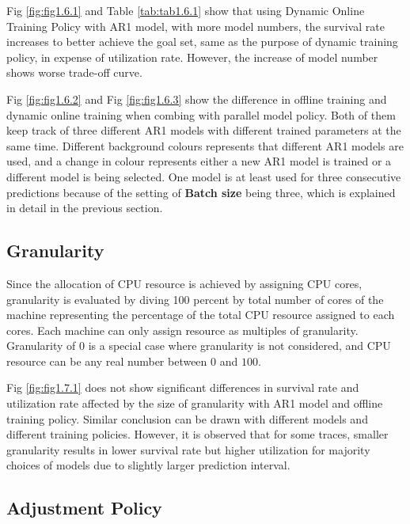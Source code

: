 \documentclass{article}
\begin{document}
\begin{flushleft}
Fig \ref{fig:fig1.6.1} and Table \ref{tab:tab1.6.1} show that using Dynamic Online Training Policy with AR1 model, with more model numbers, the survival rate increases to better achieve the goal set, same as the purpose of dynamic training policy, in expense of utilization rate. However, the increase of model number shows worse trade-off curve.

Fig \ref{fig:fig1.6.2} and Fig \ref{fig:fig1.6.3} show the difference in offline training and dynamic online training when combing with parallel model policy. Both of them keep track of three different AR1 models with different trained parameters at the same time. Different background colours represents that different AR1 models are used, and a change in colour represents either a new AR1 model is trained or a different model is being selected. One model is at least used for three consecutive predictions because of the setting of \textbf{Batch size} being three, which is explained in detail in the previous section.
\end{flushleft}

\subsection{Granularity}

\begin{flushleft}
Since the allocation of CPU resource is achieved by assigning CPU cores, granularity is evaluated by diving 100 percent by total number of cores of the machine representing the percentage of the total CPU resource assigned to each cores. Each machine can only assign resource as multiples of granularity. Granularity of $0$ is a special case where granularity is not considered, and CPU resource can be any real number between $0$ and $100$.

Fig \ref{fig:fig1.7.1} does not show significant differences in survival rate and utilization rate affected by the size of granularity with AR1 model and offline training policy. Similar conclusion can be drawn with different models and different training policies. However, it is observed that for some traces, smaller granularity results in lower survival rate but higher utilization for majority choices of models due to slightly larger prediction interval.
\end{flushleft}

\subsection{Adjustment Policy}
\end{document}
